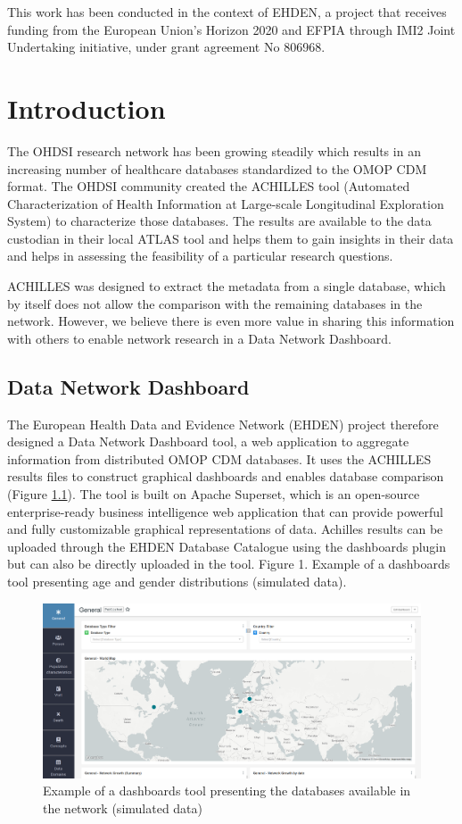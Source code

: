 \documentclass[]{book}
\begin{document}
This work has been conducted in the context of EHDEN, a project that
receives funding from the European Union's Horizon 2020 and EFPIA
through IMI2 Joint Undertaking initiative, under grant agreement No
806968.

\chapter{Introduction}\label{introduction}

The OHDSI research network has been growing steadily which results in an
increasing number of healthcare databases standardized to the OMOP CDM
format. The OHDSI community created the ACHILLES tool (Automated
Characterization of Health Information at Large-scale Longitudinal
Exploration System) to characterize those databases. The results are
available to the data custodian in their local ATLAS tool and helps them
to gain insights in their data and helps in assessing the feasibility of
a particular research questions.

ACHILLES was designed to extract the metadata from a single database,
which by itself does not allow the comparison with the remaining
databases in the network. However, we believe there is even more value
in sharing this information with others to enable network research in a
Data Network Dashboard.

\section{Data Network Dashboard}\label{data-network-dashboard}

The European Health Data and Evidence Network (EHDEN) project therefore
designed a Data Network Dashboard tool, a web application to aggregate
information from distributed OMOP CDM databases. It uses the ACHILLES
results files to construct graphical dashboards and enables database
comparison (Figure \ref{fig:cdmBI}). The tool is built on Apache
Superset, which is an open-source enterprise-ready business intelligence
web application that can provide powerful and fully customizable
graphical representations of data. Achilles results can be uploaded
through the EHDEN Database Catalogue using the dashboards plugin but can
also be directly uploaded in the tool. Figure 1. Example of a dashboards
tool presenting age and gender distributions (simulated data).

\begin{figure}
\includegraphics[width=1\linewidth]{images/cdmBI} \caption{Example of a dashboards tool presenting the databases available in the network (simulated data)}\label{fig:cdmBI}
\end{figure}
\end{document}
